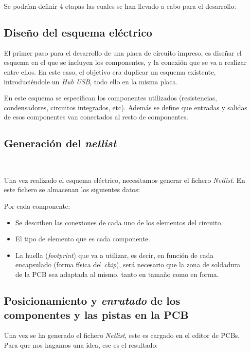 Se podrían definir 4 etapas las cuales se han llevado a cabo para el desarrollo:

\subsection{Diseño del esquema eléctrico}\label{diseño_del_esquema_electrico}

El primer paso para el desarrollo de una placa de circuito impreso, es diseñar el esquema en el que se incluyen los componentes, y la conexión que se va a realizar entre ellos. En este caso, el objetivo era duplicar un esquema existente, introduciéndole un \emph{Hub USB}, todo ello en la misma placa.

En este esquema se especifican los componentes utilizados (resistencias, condensadores, circuitos integrados, etc). Además se define que entradas y salidas de esos componentes van conectados al resto de componentes.


\subsection{Generación del \emph{netlist}}\

Una vez realizado el esquema eléctrico, necesitamos generar el fichero \emph{Netlist}. En este fichero se almacenan los siguientes datos:

Por cada componente:

\begin{itemize}
\item
Se describen las conexiones de cada uno de los elementos del circuito.
\item
El tipo de elemento que es cada componente.
\item
La huella (\emph{footprint}) que va a utilizar, es decir, en función de cada encapsulado (forma física del \emph{chip}), será necesario que la zona de soldadura de la PCB sea adaptada al mismo, tanto en tamaño como en forma.
\end{itemize}


\subsection{Posicionamiento y \textit{enrutado} de los componentes y las pistas en la PCB}\label{posicionamiento_y_enrutado_de_los_componentes_y_las_pistas_en_la_pcb}

Una vez se ha generado el fichero \emph{Netlist}, este es cargado en el editor de PCBs. Para que nos hagamos una idea, ese es el resultado:


